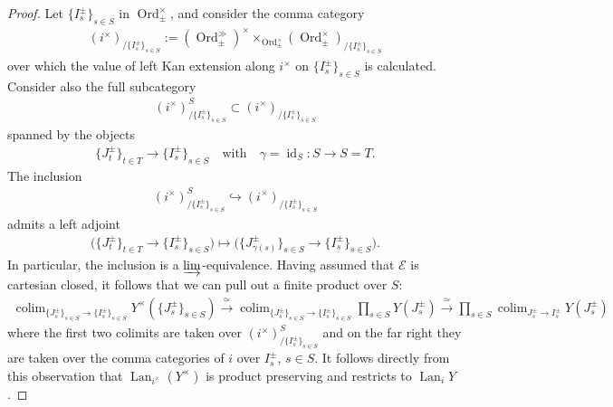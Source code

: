 \documentclass[12pt, reqno]{amsart}
\theoremstyle{plain}
\theoremstyle{definition}
\begin{document}
\begin{proof}
Let $\{I_s^\pm\}_{s\in S}$ in $\operatorname{Ord}_\pm^\times$, and consider the comma category
\begin{align*}
(i^\times)_{/\{I_s^\pm\}_{s\in S}}:=(\operatorname{Ord}_\pm^\gg)^\times \mathop{\times}_{\operatorname{Ord}_\pm^\times}(\operatorname{Ord}_\pm^\times)_{/\{I_s^\pm\}_{s\in S}}
\end{align*}
over which the value of left Kan extension along $i^\times$ on $\{I_s^\pm\}_{s\in S}$ is calculated. Consider also the full subcategory
\begin{align*}
(i^\times)_{/\{I_s^\pm\}_{s\in S}}^S \subset (i^\times)_{/\{I_s^\pm\}_{s\in S}}
\end{align*}
spanned by the objects
\begin{align*}
\{J_t^\pm\}_{t\in T}\rightarrow \{I_s^\pm\}_{s\in S}\quad\text{with}\quad \gamma=\operatorname{id}_S\colon S\rightarrow S=T.
\end{align*}
The inclusion
\begin{align*}
(i^\times)_{/\{I_s^\pm\}_{s\in S}}^S \hookrightarrow (i^\times)_{/\{I_s^\pm\}_{s\in S}}
\end{align*}
admits a left adjoint
\begin{align*}
\big(\{J_t^\pm\}_{t\in T}\rightarrow \{I_s^\pm\}_{s\in S}\big) \mapsto \big(\{J_{\gamma(s)}^\pm\}_{s\in S}\rightarrow \{I_s^\pm\}_{s\in S}\big).
\end{align*}
In particular, the inclusion is a $\varinjlim$-equivalence. Having assumed that $\mathcal{E}$ is cartesian closed, it follows that we can pull out a finite product over $S$:
\begin{align*}
\mathop{\operatorname{colim}}_{\{J_s^\pm\}_{s\in S}\rightarrow \{I_s^\pm\}_{s\in S}}Y^\times(\{J_s^\pm\}_{s\in S}) \xrightarrow{\ \simeq\ }\mathop{\operatorname{colim}}_{\{J_s^\pm\}_{s\in S}\rightarrow \{I_s^\pm\}_{s\in S}}\prod_{s\in S} Y(J_s^\pm)\xrightarrow{\ \simeq\ }\prod_{s\in S}\mathop{\operatorname{colim}}_{J_s^\pm\rightarrow I_s^\pm} Y(J_s^\pm)
\end{align*}
where the first two colimits are taken over $(i^\times)_{/\{I_s^\pm\}_{s\in S}}^S$ and on the far right they are taken over the comma categories of $i$ over $I_s^\pm$, $s\in S$.
It follows directly from this observation that $\operatorname{Lan}_{i^\times}(Y^\times)$ is product preserving and restricts to $\operatorname{Lan}_i Y$.
\end{proof}
\end{document}
